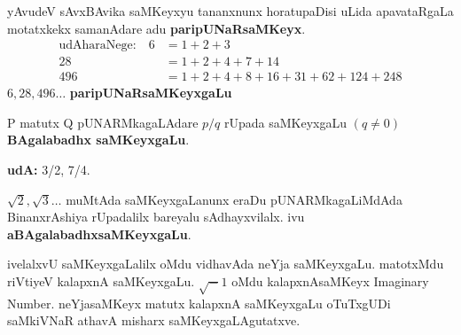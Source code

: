 yAvudeV sAvxBAvika saMKeyxyu tananxnunx horatupaDisi uLida apavataRgaLa motatxkekx samanAdare adu \textbf{paripUNaRsaMKeyx}.
\begin{align*}
\text{udAharaNege:}\quad  6 &= 1+2+3\\
28 &= 1+2+4+7+14\\
496 &= 1+2+4+8+16+31+62+124+248
\end{align*} 
$6,28,496\ldots$ \textbf{paripUNaRsaMKeyxgaLu}

{\rm P} matutx {\rm Q} pUNARMkagaLAdare $p/q$ rUpada saMKeyxgaLu $(q\neq 0)$ \textbf{BAgalabadhx saMKeyxgaLu}.

\textbf{udA:} {\rm 3/2, 7/4}.

${\sqrt 2}, {\sqrt 3}\ldots$ muMtAda saMKeyxgaLanunx eraDu pUNARMkagaLiMdAda BinanxrAshiya rUpadalilx bareyalu sAdhayxvilalx. ivu \textbf{aBAgalabadhxsaMKeyxgaLu}.

ivelalxvU saMKeyxgaLalilx oMdu vidhavAda neYja saMKeyxgaLu. matotxMdu riVtiyeV kalapxnA  saMKeyxgaLu. $\sqrt-1$ oMdu kalapxnAsaMKeyx {\rm Imaginary Number}. neYjasaMKeyx matutx kalapxnA saMKeyxgaLu oTuTxgUDi saMkiVNaR athavA misharx saMKeyxgaLAgutatxve. 
